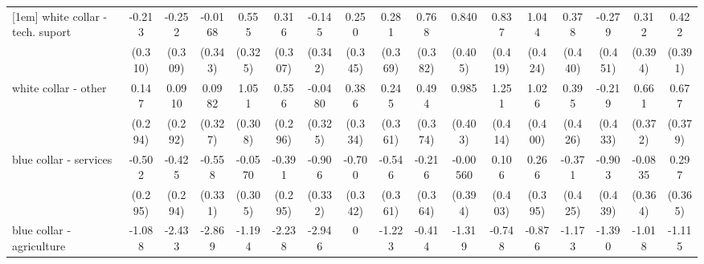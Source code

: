 {\begin{tabular}{l*{16}{c}}
[1em]
white collar - tech. suport&      -0.213         &      -0.252         &     -0.0168         &       0.555         &       0.316         &      -0.145         &       0.250         &       0.281         &       0.768\sym{*}  &       0.840\sym{*}  &       0.837\sym{*}  &       1.044\sym{*}  &       0.378         &      -0.279         &       0.312         &       0.422         \\
                    &     (0.310)         &     (0.309)         &     (0.343)         &     (0.325)         &     (0.307)         &     (0.342)         &     (0.345)         &     (0.369)         &     (0.382)         &     (0.405)         &     (0.419)         &     (0.424)         &     (0.440)         &     (0.451)         &     (0.394)         &     (0.391)         \\
[1em]
white collar - other&       0.147         &      0.0910         &      0.0982         &       1.051\sym{***}&       0.556         &     -0.0480         &       0.386         &       0.245         &       0.494         &       0.985\sym{*}  &       1.251\sym{**} &       1.026\sym{*}  &       0.395         &      -0.219         &       0.661         &       0.677         \\
                    &     (0.294)         &     (0.292)         &     (0.327)         &     (0.308)         &     (0.296)         &     (0.325)         &     (0.334)         &     (0.361)         &     (0.374)         &     (0.403)         &     (0.414)         &     (0.400)         &     (0.426)         &     (0.433)         &     (0.372)         &     (0.379)         \\
[1em]
blue collar - services&      -0.502         &      -0.425         &      -0.558         &     -0.0570         &      -0.391         &      -0.906\sym{**} &      -0.700\sym{*}  &      -0.546         &      -0.216         &    -0.00560         &       0.106         &       0.266         &      -0.371         &      -0.903\sym{*}  &     -0.0835         &       0.297         \\
                    &     (0.295)         &     (0.294)         &     (0.331)         &     (0.305)         &     (0.295)         &     (0.332)         &     (0.342)         &     (0.361)         &     (0.364)         &     (0.394)         &     (0.403)         &     (0.395)         &     (0.425)         &     (0.439)         &     (0.364)         &     (0.365)         \\
[1em]
blue collar - agriculture&      -1.088         &      -2.433\sym{**} &      -2.869\sym{*}  &      -1.194         &      -2.238\sym{*}  &      -2.946\sym{**} &           0         &      -1.223         &      -0.414         &      -1.319         &      -0.748         &      -0.876         &      -1.173         &      -1.390         &      -1.018         &      -1.115         \\

\end{tabular}}

